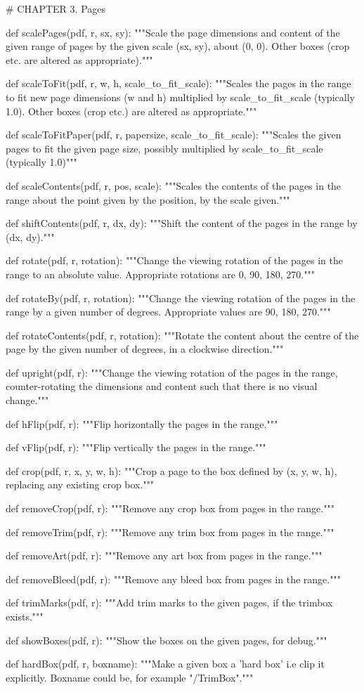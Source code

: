 # CHAPTER 3. Pages

def scalePages(pdf, r, sx, sy):
    """Scale the page dimensions and content of the given range of pages by
    the given scale (sx, sy), about (0, 0). Other boxes (crop etc. are altered
    as appropriate)."""

def scaleToFit(pdf, r, w, h, scale_to_fit_scale):
    """Scales the pages in the range to fit new page dimensions (w and h)
    multiplied by scale_to_fit_scale (typically 1.0).  Other boxes (crop etc.)
    are altered as appropriate."""

def scaleToFitPaper(pdf, r, papersize, scale_to_fit_scale):
    """Scales the given pages to fit the given page size, possibly multiplied
    by scale_to_fit_scale (typically 1.0)"""

def scaleContents(pdf, r, pos, scale):
    """Scales the contents of the pages in the range about the point given by
    the position, by the scale given."""

def shiftContents(pdf, r, dx, dy):
    """Shift the content of the pages in the range by (dx, dy)."""

def rotate(pdf, r, rotation):
    """Change the viewing rotation of the pages in the range to an
    absolute value. Appropriate rotations are 0, 90, 180, 270."""

def rotateBy(pdf, r, rotation):
    """Change the viewing rotation of the pages in the range by a
    given number of degrees. Appropriate values are 90, 180, 270."""

def rotateContents(pdf, r, rotation):
    """Rotate the content about the centre
    of the page by the given number of degrees, in a clockwise direction."""

def upright(pdf, r):
    """Change the viewing rotation of the pages in the range, counter-rotating
    the dimensions and content such that there is no visual change."""

def hFlip(pdf, r):
    """Flip horizontally the pages in the range."""

def vFlip(pdf, r):
    """Flip vertically the pages in the range."""

def crop(pdf, r, x, y, w, h):
    """Crop a page to the box defined by (x, y, w, h), replacing any existing
    crop box."""

def removeCrop(pdf, r):
    """Remove any crop box from pages in the range."""

def removeTrim(pdf, r):
    """Remove any trim box from pages in the range."""

def removeArt(pdf, r):
    """Remove any art box from pages in the range."""

def removeBleed(pdf, r):
    """Remove any bleed box from pages in the range."""

def trimMarks(pdf, r):
    """Add trim marks to the given pages, if the trimbox exists."""

def showBoxes(pdf, r):
    """Show the boxes on the given pages, for debug."""

def hardBox(pdf, r, boxname):
    """Make a given box a 'hard box' i.e clip it explicitly. Boxname could be,
    for example "/TrimBox"."""
